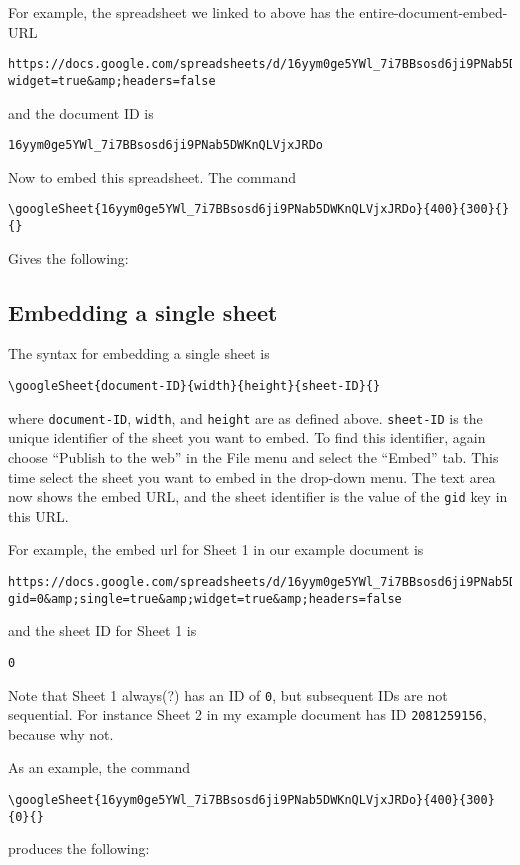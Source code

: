 \documentclass{ximera}
\begin{document}
For example, the spreadsheet we linked to above has the entire-document-embed-URL
\begin{verbatim}
https://docs.google.com/spreadsheets/d/16yym0ge5YWl_7i7BBsosd6ji9PNab5DWKnQLVjxJRDo/pubhtml?widget=true&amp;headers=false
\end{verbatim}
and the document ID is
\begin{verbatim}
16yym0ge5YWl_7i7BBsosd6ji9PNab5DWKnQLVjxJRDo
\end{verbatim}

Now to embed this spreadsheet. The command
\begin{verbatim}
\googleSheet{16yym0ge5YWl_7i7BBsosd6ji9PNab5DWKnQLVjxJRDo}{400}{300}{}{}
\end{verbatim}
Gives the following:



\subsection{Embedding a single sheet}

The syntax for embedding a single sheet is
\begin{verbatim}
\googleSheet{document-ID}{width}{height}{sheet-ID}{}
\end{verbatim}
where \texttt{document-ID}, \texttt{width}, and \texttt{height} are as defined above. \texttt{sheet-ID} is the unique identifier of the sheet you want to embed. To find this identifier, again choose ``Publish to the web'' in the File menu and select the ``Embed'' tab. This time select the sheet you want to embed in the drop-down menu. The text area now shows the embed URL, and the sheet identifier is the value of the \texttt{gid} key in this URL.

For example, the embed url for Sheet 1 in our example document is 
\begin{verbatim}
https://docs.google.com/spreadsheets/d/16yym0ge5YWl_7i7BBsosd6ji9PNab5DWKnQLVjxJRDo/pubhtml?gid=0&amp;single=true&amp;widget=true&amp;headers=false
\end{verbatim}
and the sheet ID for Sheet 1 is
\begin{verbatim}
0
\end{verbatim}
Note that Sheet 1 always(?) has an ID of \texttt{0}, but subsequent IDs are not sequential. For instance Sheet 2 in my example document has ID \texttt{2081259156}, because why not.

As an example, the command
\begin{verbatim}
\googleSheet{16yym0ge5YWl_7i7BBsosd6ji9PNab5DWKnQLVjxJRDo}{400}{300}{0}{}
\end{verbatim}
produces the following:
\end{document}
